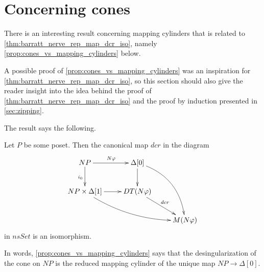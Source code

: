 
\section{Concerning cones}
\label{sec:cones}


There is an interesting result concerning mapping cylinders that is related to \cref{thm:barratt_nerve_rep_map_dcr_iso}, namely \cref{prop:cones_vs_mapping_cylinders} below.

A possible proof of \cref{prop:cones_vs_mapping_cylinders} was an inspiration for \cref{thm:barratt_nerve_rep_map_dcr_iso}, so this section should also give the reader insight into the idea behind the proof of \cref{thm:barratt_nerve_rep_map_dcr_iso} and the proof by induction presented in \cref{sec:zipping}.

The result says the following.
\begin{proposition}
\label{prop:cones_vs_mapping_cylinders}
Let $P$ be some poset. Then the canonical map $dcr$ in the diagram
\begin{displaymath}
\xymatrix{
NP \ar[d]_{i_0} \ar[r]^{N\varphi } & \Delta [0] \ar[d] \ar@/^1.5pc/[ddr] \\
NP\times \Delta [1] \ar@/_1pc/[drr] \ar[r] & DT(N\varphi ) \ar[dr]^{dcr} \\
&& M(N\varphi )
}
\end{displaymath}
in $nsSet$ is an isomorphism.
\end{proposition}
\noindent In words, \cref{prop:cones_vs_mapping_cylinders} says that the desingularization of the cone on $NP$ is the reduced mapping cylinder of the unique map $NP\to \Delta [0]$.
